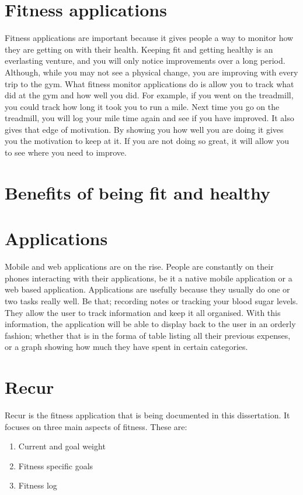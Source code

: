 \section{Fitness applications}
Fitness applications are important because it gives people a way to monitor how they are getting on with their health. Keeping fit and getting healthy is an everlasting venture, and you will only notice improvements over a long period. Although, while you may not see a physical change, you are improving with every trip to the gym. What fitness monitor applications do is allow you to track what did at the gym and how well you did. For example, if you went on the treadmill, you could track how long it took you to run a mile. Next time you go on the treadmill, you will log your mile time again and see if you have improved. It also gives that edge of motivation. By showing you how well you are doing it gives you the motivation to keep at it. If you are not doing so great, it will allow you to see where you need to improve.\\

\section{Benefits of being fit and healthy}

\section{Applications}
Mobile and web applications are on the rise. People are constantly on their phones interacting with their applications, be it a native mobile application or a web based application. Applications are usefully because they usually do one or two tasks really well. Be that; recording notes or tracking your blood sugar levels. They allow the user to track information and keep it all organised. With this information, the application will be able to display back to the user in an orderly fashion; whether that is in the forma of table listing all their previous expenses, or a graph showing how much they have spent in certain categories.

\section{Recur}
Recur is the fitness application that is being documented in this dissertation. It focuses on three main aspects of fitness. These are:

\begin{enumerate}
\item {Current and goal weight}
\item {Fitness specific goals}
\item {Fitness log}
\end{enumerate}

